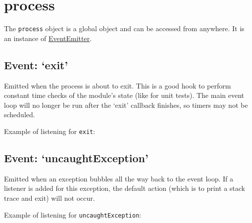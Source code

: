 \section{process}

The \texttt{process} object is a global object and can be accessed from
anywhere. It is an instance of
\href{events.html\#events\_class\_events\_eventemitter}{EventEmitter}.

\subsection{Event: `exit'}

Emitted when the process is about to exit. This is a good hook to
perform constant time checks of the module's state (like for unit
tests). The main event loop will no longer be run after the `exit'
callback finishes, so timers may not be scheduled.

Example of listening for \texttt{exit}:

\begin{Shaded}
\begin{Highlighting}[]
\NormalTok{(}\NormalTok{, } \NormalTok{() \{}
  \NormalTok{(} \NormalTok{() \{}
   \NormalTok{(}\NormalTok{);}
  \NormalTok{\});}
  \NormalTok{(}\NormalTok{);}
\NormalTok{\});}
\end{Highlighting}
\end{Shaded}

\subsection{Event: `uncaughtException'}

Emitted when an exception bubbles all the way back to the event loop. If
a listener is added for this exception, the default action (which is to
print a stack trace and exit) will not occur.

Example of listening for \texttt{uncaughtException}:

